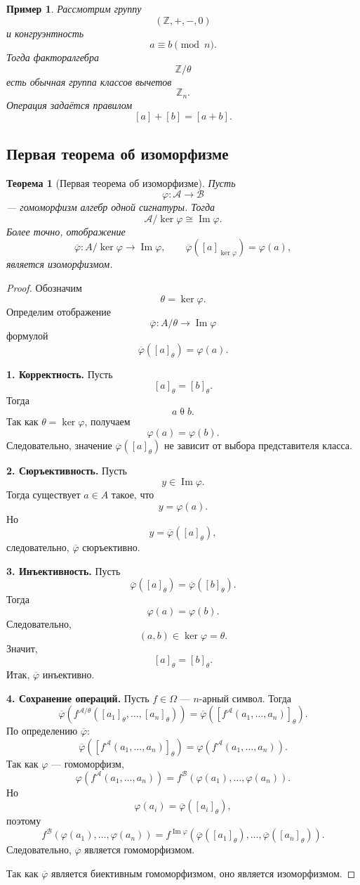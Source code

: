 \documentclass[12pt,a4paper]{article}
\newtheorem{theorem}{Теорема}
\newtheorem{example}{Пример}
\begin{document}
\begin{example}
Рассмотрим группу
\[
(\mathbb Z,+,-,0)
\]
и конгруэнтность
\[
a\equiv b\pmod n.
\]
Тогда факторалгебра
\[
\mathbb Z/\theta
\]
есть обычная группа классов вычетов
\[
\mathbb Z_n.
\]
Операция задаётся правилом
\[
[a]+[b]=[a+b].
\]
\end{example}

\subsection{Первая теорема об изоморфизме}

\begin{theorem}[Первая теорема об изоморфизме]
Пусть
\[
\varphi\colon \mathcal A\to\mathcal B
\]
--- гомоморфизм алгебр одной сигнатуры. Тогда
\[
\mathcal A/\ker\varphi\cong \operatorname{Im}\varphi.
\]
Более точно, отображение
\[
\overline{\varphi}\colon A/\ker\varphi\to \operatorname{Im}\varphi,
\qquad
\overline{\varphi}([a]_{\ker\varphi})=\varphi(a),
\]
является изоморфизмом.
\end{theorem}

\begin{proof}
Обозначим
\[
\theta=\ker\varphi.
\]
Определим отображение
\[
\overline{\varphi}\colon A/\theta\to \operatorname{Im}\varphi
\]
формулой
\[
\overline{\varphi}([a]_\theta)=\varphi(a).
\]

\textbf{1. Корректность.}
Пусть
\[
[a]_\theta=[b]_\theta.
\]
Тогда
\[
a\mathrel{\theta}b.
\]
Так как $\theta=\ker\varphi$, получаем
\[
\varphi(a)=\varphi(b).
\]
Следовательно, значение $\overline{\varphi}([a]_\theta)$ не зависит от выбора представителя класса.

\textbf{2. Сюръективность.}
Пусть
\[
y\in \operatorname{Im}\varphi.
\]
Тогда существует $a\in A$ такое, что
\[
y=\varphi(a).
\]
Но
\[
y=\overline{\varphi}([a]_\theta),
\]
следовательно, $\overline{\varphi}$ сюръективно.

\textbf{3. Инъективность.}
Пусть
\[
\overline{\varphi}([a]_\theta)=\overline{\varphi}([b]_\theta).
\]
Тогда
\[
\varphi(a)=\varphi(b).
\]
Следовательно,
\[
(a,b)\in\ker\varphi=\theta.
\]
Значит,
\[
[a]_\theta=[b]_\theta.
\]
Итак, $\overline{\varphi}$ инъективно.

\textbf{4. Сохранение операций.}
Пусть $f\in\Omega$ --- $n$-арный символ. Тогда
\[
\overline{\varphi}
\left(
f^{\mathcal A/\theta}([a_1]_\theta,\dots,[a_n]_\theta)
\right)
=
\overline{\varphi}
\left(
[f^{\mathcal A}(a_1,\dots,a_n)]_\theta
\right).
\]
По определению $\overline{\varphi}$:
\[
\overline{\varphi}
\left(
[f^{\mathcal A}(a_1,\dots,a_n)]_\theta
\right)
=
\varphi(f^{\mathcal A}(a_1,\dots,a_n)).
\]
Так как $\varphi$ --- гомоморфизм,
\[
\varphi(f^{\mathcal A}(a_1,\dots,a_n))
=
f^{\mathcal B}(\varphi(a_1),\dots,\varphi(a_n)).
\]
Но
\[
\varphi(a_i)=\overline{\varphi}([a_i]_\theta),
\]
поэтому
\[
f^{\mathcal B}(\varphi(a_1),\dots,\varphi(a_n))
=
f^{\operatorname{Im}\varphi}
(
\overline{\varphi}([a_1]_\theta),
\dots,
\overline{\varphi}([a_n]_\theta)
).
\]
Следовательно, $\overline{\varphi}$ является гомоморфизмом.

Так как $\overline{\varphi}$ является биективным гомоморфизмом, оно является изоморфизмом.
\end{proof}
\end{document}
